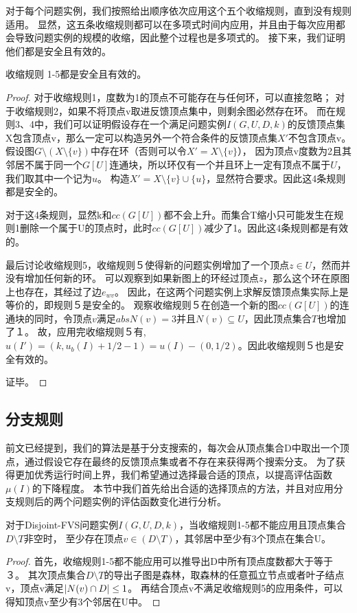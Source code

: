 对于每个问题实例，我们按照给出顺序依次应用这个五个收缩规则，直到没有规则适用。
显然，这五条收缩规则都可以在多项式时间内应用，并且由于每次应用都会导致问题实例的规模的收缩，因此整个过程也是多项式的。
接下来，我们证明他们都是安全且有效的。

\begin{lemma}
收缩规则 1-5都是安全且有效的。
\end{lemma}
\begin{proof}
对于收缩规则1，度数为1的顶点不可能存在与任何环，可以直接忽略；
对于收缩规则2，如果不将顶点v取进反馈顶点集中，则剩余图必然存在环。
而在规则3、4中，我们可以证明假设存在一个满足问题实例$I(G, U, D, k)$的反馈顶点集X包含顶点v，那么一定可以构造另外一个符合条件的反馈顶点集$X'$不包含顶点v。
假设图$G \setminus (X \setminus \{v\})$中存在环（否则可以令$X' = X \setminus \{v\}$），
因为顶点v度数为2且其邻居不属于同一个$G[U]$连通块，所以环仅有一个并且环上一定有顶点不属于$U$，我们取其中一个记为$u$。
构造$X' = X \setminus \{v\} \cup \{u\}$，显然符合要求。因此这4条规则都是安全的。

对于这4条规则，显然k和$cc(G[U])$都不会上升。而集合T缩小只可能发生在规则1删除一个属于U的顶点时，此时$cc(G[U])$减少了1。因此这4条规则都是有效的。

最后讨论收缩规则5，收缩规则５使得新的问题实例增加了一个顶点$z \in U$，然而并没有增加任何新的环。
可以观察到如果新图上的环经过顶点$z$，那么这个环在原图上也存在，其经过了边$e_{wv}$。
因此，在这两个问题实例上求解反馈顶点集实际上是等价的，即规则５是安全的。
观察收缩规则５在创造一个新的图$cc(G[U])$的连通块的同时，令顶点$v$满足$abs{N(v)} = 3$并且$N(v) \subseteq U$，因此顶点集合$T$也增加了１。
故，应用完收缩规则５有,$u(I') = (k, u_b(I) + 1/2 - 1) = u(I) - (0, 1/2)$。因此收缩规则５也是安全有效的。

证毕。
\end{proof}


\subsection{分支规则}
前文已经提到，我们的算法是基于分支搜索的，每次会从顶点集合D中取出一个顶点，通过假设它存在最终的反馈顶点集或者不存在来获得两个搜索分支。
为了获得更加优秀运行时间上界，我们希望通过选择最合适的顶点，以提高评估函数$\mu(I)$的下降程度。
本节中我们首先给出合适的选择顶点的方法，并且对应用分支规则后的两个问题实例的评估函数变化进行分析。

\begin{lemma}
对于Disjoint-FVS问题实例$I(G,U,D,k)$，当收缩规则1-5都不能应用且顶点集合$D \setminus T$非空时，
至少存在顶点$v \in (D \setminus T)$，其邻居中至少有3个顶点在集合U。
\end{lemma}
\begin{proof}
首先，收缩规则1-5都不能应用可以推导出D中所有顶点度数都大于等于３。
其次顶点集合$D \setminus T$的导出子图是森林，取森林的任意孤立节点或者叶子结点v，顶点v满足$\left\vert N(v) \cap D \right\vert \le 1$。
再结合顶点v不满足收缩规则5的应用条件，可以得知顶点v至少有3个邻居在U中。
\end{proof}

